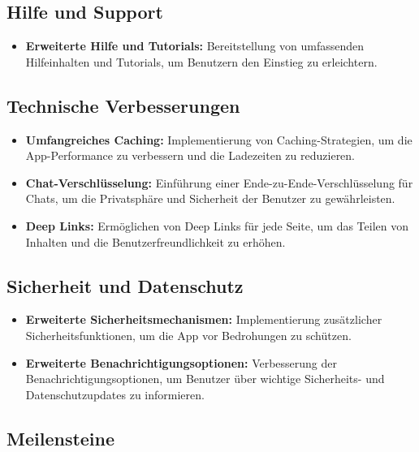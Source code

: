 \subsection{Hilfe und Support}
\begin{itemize}
    \item \textbf{Erweiterte Hilfe und Tutorials:} Bereitstellung von umfassenden Hilfeinhalten und Tutorials, um Benutzern den Einstieg zu erleichtern.
\end{itemize}

\subsection{Technische Verbesserungen}
\begin{itemize}
    \item \textbf{Umfangreiches Caching:} Implementierung von Caching-Strategien, um die App-Performance zu verbessern und die Ladezeiten zu reduzieren.
    \item \textbf{Chat-Verschlüsselung:} Einführung einer Ende-zu-Ende-Verschlüsselung für Chats, um die Privatsphäre und Sicherheit der Benutzer zu gewährleisten.
    \item \textbf{Deep Links:} Ermöglichen von Deep Links für jede Seite, um das Teilen von Inhalten und die Benutzerfreundlichkeit zu erhöhen.
\end{itemize}

\subsection{Sicherheit und Datenschutz}
\begin{itemize}
    \item \textbf{Erweiterte Sicherheitsmechanismen:} Implementierung zusätzlicher Sicherheitsfunktionen, um die App vor Bedrohungen zu schützen.
    \item \textbf{Erweiterte Benachrichtigungsoptionen:} Verbesserung der Benachrichtigungsoptionen, um Benutzer über wichtige Sicherheits- und Datenschutzupdates zu informieren.
\end{itemize}



\subsection{Meilensteine}

